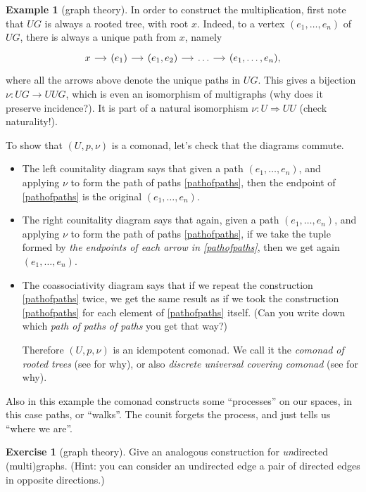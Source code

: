 \documentclass[a4paper,11pt,oneside]{scrbook}
\numberwithin{equation}{section}
\theoremstyle{plain}
\theoremstyle{definition}
\newtheorem{eg}[thm]{Example}
\newtheorem{ex}[thm]{Exercise}
\newcommand{\ar}[2][]{\arrow{#2}{#1}}
\DeclareMathOperator{\1}{\mathbbm{1}}
\DeclareMathOperator{\2}{\mathbbm{2}}
\begin{document}
\begin{eg}[graph theory]
 In order to construct the multiplication, first note that $UG$ is always a rooted tree, with root $x$. Indeed, to a vertex $(e_1,\dots,e_n)$ of $UG$, there is always a unique path from $x$, namely
 \begin{equation}\label{pathofpaths}
 \begin{tikzcd}[sep=small]
  x \ar{r} & (e_1) \ar{r} & (e_1,e_2) \ar{r} &\dots \ar{r} & (e_1,\dots,e_n) ,
 \end{tikzcd}
 \end{equation}
 where all the arrows above denote the unique paths in $UG$.
 This gives a bijection $\nu:UG\to UUG$,
 which is even an isomorphism of multigraphs (why does it preserve incidence?). It is part of a natural isomorphism $\nu:U\Rightarrow UU$ (check naturality!).
 
 To show that $(U,p,\nu)$ is a comonad, let's check that the diagrams  commute. 
 \begin{itemize}
  \item The left counitality diagram says that given a path $(e_1,\dots,e_n)$, and applying $\nu$ to form the path of paths \eqref{pathofpaths},
  then the endpoint of \eqref{pathofpaths} is the original $(e_1,\dots,e_n)$.
  \item The right counitality diagram says that again, given a path $(e_1,\dots,e_n)$, and applying $\nu$ to form the path of paths \eqref{pathofpaths}, if we take the tuple formed by \emph{the endpoints of each arrow in \eqref{pathofpaths}}, then we get again $(e_1,\dots,e_n)$.
  \item The coassociativity diagram says that if we repeat the construction \eqref{pathofpaths} twice, we get the same result as if we took the construction \eqref{pathofpaths} for each element of \eqref{pathofpaths} itself. (Can you write down which \emph{path of paths of paths} you get that way?)
  
  Therefore $(U,p,\nu)$ is an idempotent comonad. We call it the \emph{comonad of rooted trees} (see  for why), or also \emph{discrete universal covering comonad} (see  for why). 
 \end{itemize}
\end{eg}

Also in this example the comonad constructs some ``processes'' on our spaces, in this case paths, or ``walks''. The counit forgets the process, and just tells us ``where we are''.

\begin{ex}[graph theory]\label{ucugraph}
 Give an analogous construction for \emph{un}directed (multi)graphs. (Hint: you can consider an undirected edge a pair of directed edges in opposite directions.)
\end{ex}
\end{document}
